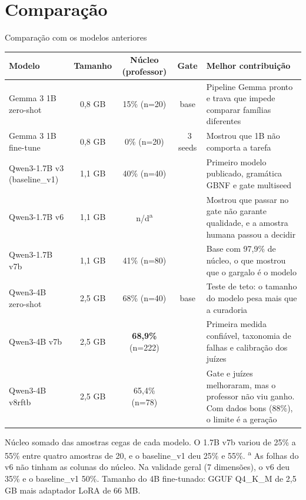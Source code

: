 \documentclass[aspectratio=169,11pt]{beamer}
\newcommand{\okmark}{{\color{okgreen}\faCheckCircle}}
\newcommand{\badmark}{{\color{badred}\faTimesCircle}}
\begin{document}
\section{Comparação}
\begin{frame}{Comparação com os modelos anteriores}
  \centering
  \scriptsize
  \begin{tabularx}{\textwidth}{@{}l c c c >{\raggedright\arraybackslash}X@{}}
    \toprule
    Modelo & Tamanho & Núcleo (professor) & Gate & Melhor contribuição \\
    \midrule
    Gemma 3 1B zero-shot & 0,8 GB & 15\% (n=20) & base & Pipeline Gemma pronto e trava que impede comparar famílias diferentes \\
    Gemma 3 1B fine-tune & 0,8 GB & 0\% (n=20) & \badmark\ 3 seeds & Mostrou que 1B não comporta a tarefa \\
    Qwen3-1.7B v3 (baseline\_v1) & 1,1 GB & 40\% (n=40) & \okmark & Primeiro modelo publicado, gramática GBNF e gate multiseed \\
    Qwen3-1.7B v6 & 1,1 GB & n/d\textsuperscript{a} & \okmark & Mostrou que passar no gate não garante qualidade, e a amostra humana passou a decidir \\
    Qwen3-1.7B v7b & 1,1 GB & 41\% (n=80) & \okmark & Base com 97,9\% de núcleo, o que mostrou que o gargalo é o modelo \\
    Qwen3-4B zero-shot & 2,5 GB & 68\% (n=40) & base & Teste de teto: o tamanho do modelo pesa mais que a curadoria \\
    Qwen3-4B v7b & 2,5 GB & \textbf{68,9\%} (n=222) & \okmark & Primeira medida confiável, taxonomia de falhas e calibração dos juízes \\
    \rowcolor{lightgreen}
    Qwen3-4B v8rftb & 2,5 GB & 65,4\% (n=78) & \okmark & Gate e juízes melhoraram, mas o professor não viu ganho. Com dados bons (88\%), o limite é a geração \\
    \bottomrule
  \end{tabularx}
  \vspace{4pt}

  \raggedright
  \tiny Núcleo somado das amostras cegas de cada modelo. O 1.7B v7b variou de 25\% a 55\% entre quatro amostras de 20, e o baseline\_v1 deu 25\% e 55\%.
  \textsuperscript{a} As folhas do v6 não tinham as colunas do núcleo. Na validade geral (7 dimensões), o v6 deu 35\% e o baseline\_v1 50\%.
  Tamanho do 4B fine-tunado: GGUF Q4\_K\_M de 2,5 GB mais adaptador LoRA de 66 MB.
\end{frame}
\end{document}
